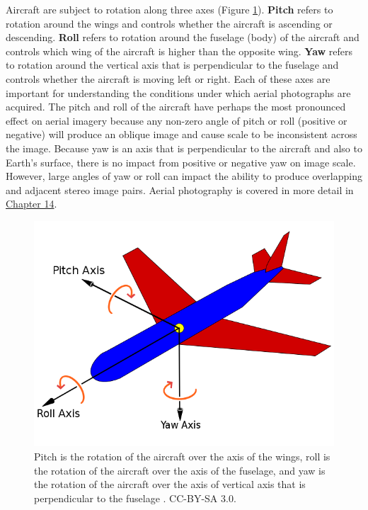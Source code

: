 \documentclass[
]{book}
\begin{document}
Aircraft are subject to rotation along three axes (Figure \ref{fig:12-pitch-roll-yaw}). \textbf{Pitch} refers to rotation around the wings and controls whether the aircraft is ascending or descending. \textbf{Roll} refers to rotation around the fuselage (body) of the aircraft and controls which wing of the aircraft is higher than the opposite wing. \textbf{Yaw} refers to rotation around the vertical axis that is perpendicular to the fuselage and controls whether the aircraft is moving left or right. Each of these axes are important for understanding the conditions under which aerial photographs are acquired. The pitch and roll of the aircraft have perhaps the most pronounced effect on aerial imagery because any non-zero angle of pitch or roll (positive or negative) will produce an oblique image and cause scale to be inconsistent across the image. Because yaw is an axis that is perpendicular to the aircraft and also to Earth's surface, there is no impact from positive or negative yaw on image scale. However, large angles of yaw or roll can impact the ability to produce overlapping and adjacent stereo image pairs. Aerial photography is covered in more detail in \href{https://ubc-geomatics-textbook.github.io/geomatics-textbook/image-analysis.html}{Chapter 14}.



\begin{figure}
\includegraphics[width=0.75\linewidth]{images/12-pitch-roll-yaw} \caption{Pitch is the rotation of the aircraft over the axis of the wings, roll is the rotation of the aircraft over the axis of the fuselage, and yaw is the rotation of the aircraft over the axis of vertical axis that is perpendicular to the fuselage \citep{jrvz_image_2010}. CC-BY-SA 3.0.}\label{fig:12-pitch-roll-yaw}
\end{figure}
\end{document}
